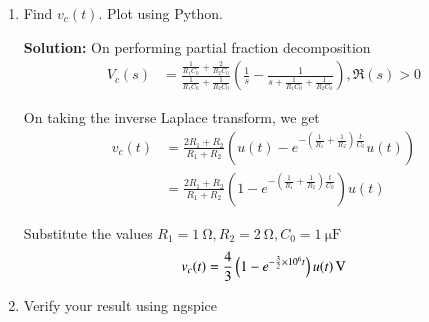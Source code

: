 \documentclass[journal,12pt,twocolumn]{IEEEtran}
\newcommand{\solution}{\noindent \textbf{Solution: }}
\providecommand{\brak}[1]{\ensuremath{\left(#1\right)}}
\providecommand{\system}[1]{\overset{\mathcal{#1}}{ \longleftrightarrow}}
\numberwithin{equation}{section}
\numberwithin{figure}{section}
\renewcommand\thesection{\arabic{section}}
\begin{document}
\begin{enumerate}[label=\thesection.\arabic*.,ref=\thesection.\theenumi]
	where 
	\begin{align}
		u(t) \system{L} V_1(s) \\
		2u(t) \system{L} V_2(s)
	\end{align}
	Find the voltage across the capacitor $V_c(s)$
	
	\solution 
	\begin{align}
		V_1(s) &= \frac{1}{s} &&\Re(s) > 0 \\
		V_2(s) &= \frac{2}{s} &&\Re(s) > 0 
	\end{align}		
		
	By Kirchoff's junction law, we get
	\begin{align}
		&\frac{V_c - V_1}{R_1} + 	\frac{V_c - V_2}{R_2} + \frac{V_c - 0}{\frac{1}{sC_0}} = 0 \\
		\implies &V_c \brak{\frac{1}{R_1} + \frac{1}{R_2} + sC_0} = \frac{V_1}{R_1} + \frac{V_2}{R_2} \\
		\implies &V_c(s) = \frac{\frac{1}{sR_1} + \frac{2}{sR_2}}{\frac{1}{R_1} + \frac{1}{R_2} + sC_0} \\
		&\qquad = \frac{\frac{1}{R_1C_0} + \frac{2}{R_2C_0}}{s\brak{s + \frac{1}{R_1C_0} + \frac{1}{R_2C_0}}} 
	\end{align}
	
	\item Find $v_c(t)$. Plot using Python.

	\solution On performing partial fraction decomposition
	\begin{align} 
		V_c(s) &=  \frac{\frac{1}{R_1C_0} + \frac{2}{R_2C_0}}{\frac{1}{R_1C_0} + \frac{1}{R_2C_0}} \brak{\frac{1}{s} - \frac{1}{s + \frac{1}{R_1C_0} + \frac{1}{R_2C_0}}}, \Re(s) > 0
	\end{align}
	
	On taking the inverse Laplace transform, we get
	\begin{align}
	v_c(t) &= \frac{2R_1 + R_2}{R_1 + R_2} \brak{u(t) - e^{-\brak{\frac{1}{R_1} + \frac{1}{R_2}} \frac{t}{C_0}} u(t)} \\
	&= \frac{2R_1 + R_2}{R_1 + R_2} \brak{1 - e^{-\brak{\frac{1}{R_1} + \frac{1}{R_2}} \frac{t}{C_0}} }u(t)
	\end{align}
	
	Substitute the values $R_1 = \SI{1}{\ohm}, R_2 = \SI{2}{\ohm}, C_0 = \SI{1}{\micro\farad}$
	\begin{align}
		v_c(t) = \SI[parse-numbers=false]{\frac{4}{3} \brak{1 - e^{-\frac{3}{2} \times 10^6 t}} u(t)}{\volt}
	\end{align}
	
	\item Verify your result using ngspice
	

\end{enumerate}
\end{document}
